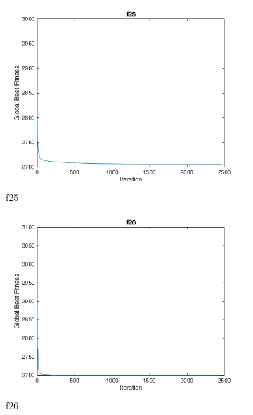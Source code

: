 \begin{figure}
  \centering
  \begin{subfigure}[b]{0.4\textwidth}
    \includegraphics[width=\textwidth]{img/cecrt/f25}
    \caption{f25}
  \end{subfigure}
  \begin{subfigure}[b]{0.4\textwidth}
    \includegraphics[width=\textwidth]{img/cecrt/f26}
    \caption{f26}
  \end{subfigure}
  \begin{subfigure}[b]{0.4\textwidth}

\end{subfigure}
\end{figure}
